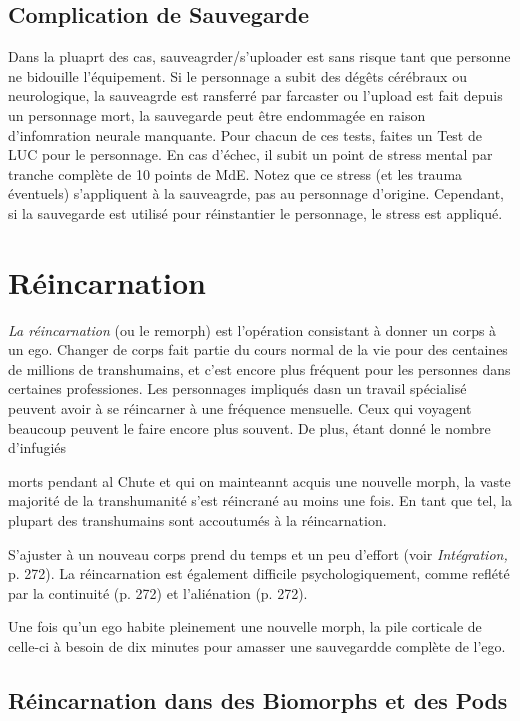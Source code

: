 \subsection{Complication de Sauvegarde} 

Dans la pluaprt des cas, sauveagrder/s'uploader est sans risque tant que personne ne bidouille l'équipement. Si le personnage a subit des dégêts cérébraux ou neurologique, la sauveagrde est ransferré par farcaster ou l'upload est fait depuis un personnage mort, la sauvegarde peut être endommagée en raison d'infomration neurale manquante. Pour chacun de ces tests, faites un Test de LUC pour le personnage. En cas d'échec, il subit un point de stress mental par tranche complète de 10 points de MdE. Notez que ce stress (et les trauma éventuels) s'appliquent à la sauveagrde, pas au personnage d'origine. Cependant, si la sauvegarde est utilisé pour réinstantier le personnage, le stress est appliqué. 

\section{Réincarnation} 

\textit{La réincarnation} (ou le remorph) est l'opération consistant à donner un corps à un ego. Changer de corps fait partie du cours normal de la vie pour des centaines de millions de transhumains, et c'est encore plus fréquent pour les personnes dans certaines professiones. Les personnages impliqués dasn un travail spécialisé peuvent avoir à se réincarner à une fréquence mensuelle. Ceux qui voyagent beaucoup peuvent le faire encore plus souvent. De plus, étant donné le nombre d'infugiés 

morts pendant al Chute et qui on mainteannt acquis une nouvelle morph, la vaste majorité de la transhumanité s'est réincrané au moins une fois. En tant que tel, la plupart des transhumains sont accoutumés à la réincarnation. 

S'ajuster à un nouveau corps prend du temps et un peu d'effort (voir \textit{Intégration,} p. 272). La réincarnation est également difficile psychologiquement, comme reflété par la continuité (p. 272) et l'aliénation (p. 272). 

Une fois qu'un ego habite pleinement une nouvelle morph, la pile corticale de celle-ci à besoin de dix minutes pour amasser une sauvegardde complète de l'ego. 

\subsection{Réincarnation dans des Biomorphs et des Pods} 

